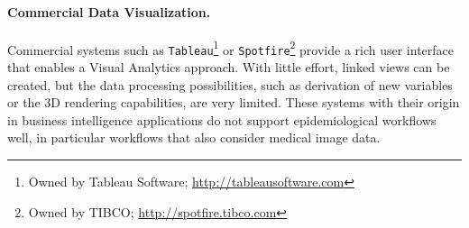 \documentclass[journal]{style/vgtc} 			          %
\begin{document}
\paragraph{Commercial Data Visualization.}
Commercial systems such as \texttt{Tableau}\footnote{Owned by Tableau Software; \url{http://tableausoftware.com}} or \texttt{Spotfire}\footnote{Owned by TIBCO; \url{http://spotfire.tibco.com}} provide a rich user interface that enables a Visual Analytics approach.
%
With little effort, linked views can be created, but the data processing possibilities, such as derivation of new variables or the 3D rendering capabilities, are very limited.
%
These systems with their origin in business intelligence applications do not support epidemiological workflows well, in particular workflows that also consider medical image data.
\end{document}
